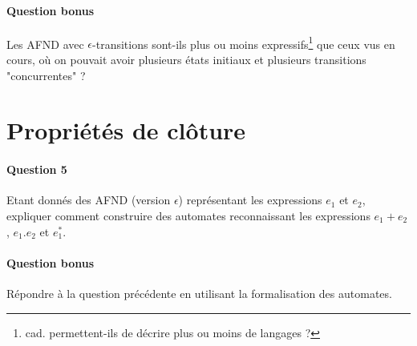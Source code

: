 \documentclass{article}[11pt]
\theoremstyle{definition}
\begin{document}
\paragraph*{Question bonus} Les AFND avec $\epsilon$-transitions sont-ils plus ou moins expressifs\footnote{cad. permettent-ils de décrire plus ou moins de langages ?} que ceux vus en cours, où on pouvait avoir plusieurs états initiaux et plusieurs transitions "concurrentes" ?


\section{Propriétés de clôture}

\paragraph*{Question 5} Etant donnés des AFND (version $\epsilon$) représentant les expressions $e_1$ et $e_2$, expliquer comment construire des automates reconnaissant les expressions $e_1 + e_2$, $e_1.e_2$ et $e_1^*$.

\paragraph*{Question bonus} Répondre à la question précédente en utilisant la formalisation des automates.


\end{document}
